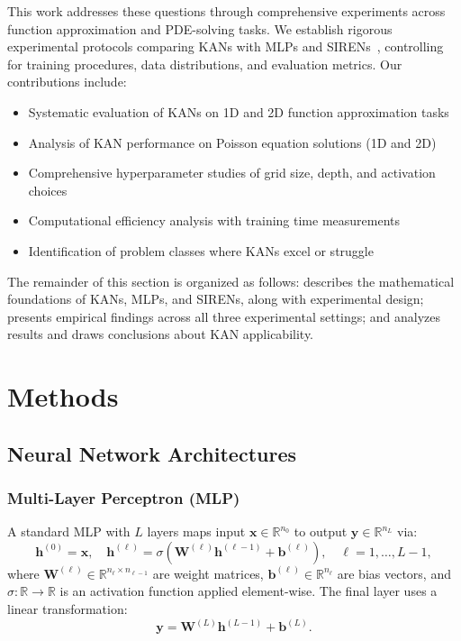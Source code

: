 \documentclass[11pt,a4paper]{article}
\newcommand{\R}{\mathbb{R}}
\begin{document}
This work addresses these questions through comprehensive experiments across function approximation and PDE-solving tasks. We establish rigorous experimental protocols comparing KANs with MLPs and SIRENs~\citep{sitzmann2020implicit}, controlling for training procedures, data distributions, and evaluation metrics. Our contributions include:
\begin{itemize}
    \item Systematic evaluation of KANs on 1D and 2D function approximation tasks
    \item Analysis of KAN performance on Poisson equation solutions (1D and 2D)
    \item Comprehensive hyperparameter studies of grid size, depth, and activation choices
    \item Computational efficiency analysis with training time measurements
    \item Identification of problem classes where KANs excel or struggle
\end{itemize}

The remainder of this section is organized as follows:  describes the mathematical foundations of KANs, MLPs, and SIRENs, along with experimental design;  presents empirical findings across all three experimental settings; and  analyzes results and draws conclusions about KAN applicability.

\section{Methods}
\label{sec:methods}

\subsection{Neural Network Architectures}

\subsubsection{Multi-Layer Perceptron (MLP)}

A standard MLP with $L$ layers maps input $\mathbf{x} \in \R^{n_0}$ to output $\mathbf{y} \in \R^{n_L}$ via:
\begin{equation}
\mathbf{h}^{(0)} = \mathbf{x}, \quad \mathbf{h}^{(\ell)} = \sigma\left(\mathbf{W}^{(\ell)} \mathbf{h}^{(\ell-1)} + \mathbf{b}^{(\ell)}\right), \quad \ell = 1, \ldots, L-1,
\end{equation}
where $\mathbf{W}^{(\ell)} \in \R^{n_\ell \times n_{\ell-1}}$ are weight matrices, $\mathbf{b}^{(\ell)} \in \R^{n_\ell}$ are bias vectors, and $\sigma: \R \to \R$ is an activation function applied element-wise. The final layer uses a linear transformation:
\begin{equation}
\mathbf{y} = \mathbf{W}^{(L)} \mathbf{h}^{(L-1)} + \mathbf{b}^{(L)}.
\end{equation}
\end{document}

